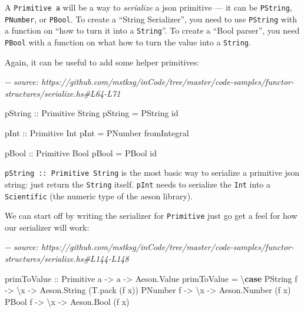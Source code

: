 \documentclass[]{article}
\newenvironment{Shaded}{}{}
\newcommand{\CommentTok}[1]{\textcolor[rgb]{0.38,0.63,0.69}{\textit{#1}}}
\newcommand{\DataTypeTok}[1]{\textcolor[rgb]{0.56,0.13,0.00}{#1}}
\newcommand{\FunctionTok}[1]{\textcolor[rgb]{0.02,0.16,0.49}{#1}}
\newcommand{\KeywordTok}[1]{\textcolor[rgb]{0.00,0.44,0.13}{\textbf{#1}}}
\newcommand{\NormalTok}[1]{#1}
\newcommand{\OtherTok}[1]{\textcolor[rgb]{0.00,0.44,0.13}{#1}}
\begin{document}
A \texttt{Primitive\ a} will be a way to \emph{serialize} a json primitive ---
it can be \texttt{PString}, \texttt{PNumber}, or \texttt{PBool}. To create a
``String Serializer'', you need to use \texttt{PString} with a function on ``how
to turn it into a \texttt{String}''. To create a ``Bool parser'', you need
\texttt{PBool} with a function on what how to turn the value into a
\texttt{String}.

Again, it can be useful to add some helper primitives:

\begin{Shaded}
\begin{Highlighting}[]
\CommentTok{{-}{-} source: https://github.com/mstksg/inCode/tree/master/code{-}samples/functor{-}structures/serialize.hs\#L64{-}L71}

\OtherTok{pString ::} \DataTypeTok{Primitive} \DataTypeTok{String}
\NormalTok{pString }\OtherTok{=} \DataTypeTok{PString} \FunctionTok{id}

\OtherTok{pInt ::} \DataTypeTok{Primitive} \DataTypeTok{Int}
\NormalTok{pInt }\OtherTok{=} \DataTypeTok{PNumber} \FunctionTok{fromIntegral}

\OtherTok{pBool ::} \DataTypeTok{Primitive} \DataTypeTok{Bool}
\NormalTok{pBool }\OtherTok{=} \DataTypeTok{PBool} \FunctionTok{id}
\end{Highlighting}
\end{Shaded}

\texttt{pString\ ::\ Primitive\ String} is the most basic way to serialize a
primitive json string: just return the \texttt{String} itself. \texttt{pInt}
needs to serialize the \texttt{Int} into a \texttt{Scientific} (the numeric type
of the aeson library).

We can start off by writing the serializer for \texttt{Primitive} just go get a
feel for how our serializer will work:

\begin{Shaded}
\begin{Highlighting}[]
\CommentTok{{-}{-} source: https://github.com/mstksg/inCode/tree/master/code{-}samples/functor{-}structures/serialize.hs\#L144{-}L148}

\OtherTok{primToValue ::} \DataTypeTok{Primitive}\NormalTok{ a }\OtherTok{{-}>}\NormalTok{ a }\OtherTok{{-}>} \DataTypeTok{Aeson.Value}
\NormalTok{primToValue }\OtherTok{=}\NormalTok{ \textbackslash{}}\KeywordTok{case}
  \DataTypeTok{PString}\NormalTok{ f }\OtherTok{{-}>}\NormalTok{ \textbackslash{}x }\OtherTok{{-}>} \DataTypeTok{Aeson.String}\NormalTok{ (T.pack (f x))}
  \DataTypeTok{PNumber}\NormalTok{ f }\OtherTok{{-}>}\NormalTok{ \textbackslash{}x }\OtherTok{{-}>} \DataTypeTok{Aeson.Number}\NormalTok{ (f x)}
  \DataTypeTok{PBool}\NormalTok{   f }\OtherTok{{-}>}\NormalTok{ \textbackslash{}x }\OtherTok{{-}>} \DataTypeTok{Aeson.Bool}\NormalTok{   (f x)}
\end{Highlighting}
\end{Shaded}
\end{document}
